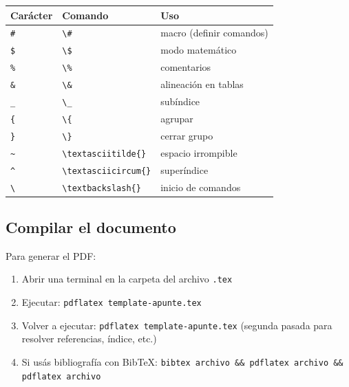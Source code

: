 \begin{center}
\begin{tabular}{lll}
\toprule
\textbf{Carácter} & \textbf{Comando} & \textbf{Uso} \\
\midrule
\texttt{\#} & \texttt{\textbackslash{}\#} & macro (definir comandos) \\
\texttt{\$} & \texttt{\textbackslash{}\$} & modo matemático \\
\texttt{\%} & \texttt{\textbackslash{}\%} & comentarios \\
\texttt{\&} & \texttt{\textbackslash{}\&} & alineación en tablas \\
\texttt{\_} & \texttt{\textbackslash{}\_} & subíndice \\
\texttt{\{} & \texttt{\textbackslash{}\{} & agrupar \\
\texttt{\}} & \texttt{\textbackslash{}\}} & cerrar grupo \\
\texttt{\textasciitilde} & \texttt{\textbackslash{}textasciitilde\{\}} & espacio irrompible \\
\texttt{\textasciicircum} & \texttt{\textbackslash{}textasciicircum\{\}} & superíndice \\
\texttt{\textbackslash} & \texttt{\textbackslash{}textbackslash\{\}} & inicio de comandos \\
\bottomrule
\end{tabular}
\end{center}

\subsection{Compilar el documento}

Para generar el PDF:
\begin{enumerate}
    \item Abrir una terminal en la carpeta del archivo \texttt{.tex}
    \item Ejecutar: \texttt{pdflatex template-apunte.tex}
    \item Volver a ejecutar: \texttt{pdflatex template-apunte.tex}
          (segunda pasada para resolver referencias, índice, etc.)
    \item Si usás bibliografía con BibTeX: \texttt{bibtex archivo \&\& pdflatex archivo \&\& pdflatex archivo}
\end{enumerate}

%

